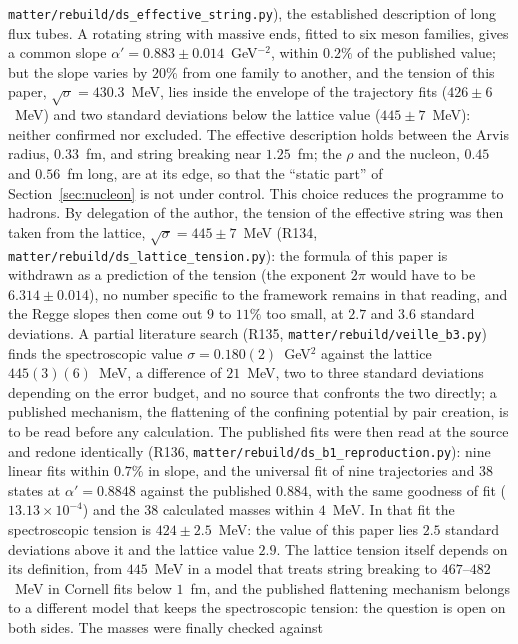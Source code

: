 \documentclass[11pt,a4paper]{article}
\theoremstyle{plain}
\theoremstyle{remark}
\begin{document}
\texttt{matter/rebuild/ds\_effective\_string.py}), the established description of long flux tubes. A rotating string
with massive ends, fitted to six meson families, gives a common slope $\alpha'=0.883\pm0.014$~GeV$^{-2}$, within
$0.2\%$ of the published value; but the slope varies by $20\%$ from one family to another, and the tension of this
paper, $\sqrt{\sigma}=430.3$~MeV, lies inside the envelope of the trajectory fits ($426\pm6$~MeV) and two standard
deviations below the lattice value ($445\pm7$~MeV): neither confirmed nor excluded. The effective description holds
between the Arvis radius, $0.33$~fm, and string breaking near $1.25$~fm; the $\rho$ and the nucleon, $0.45$ and
$0.56$~fm long, are at its edge, so that the ``static part'' of Section~\ref{sec:nucleon} is not under control. This
choice reduces the programme to hadrons. By delegation of the author, the tension of the effective string was then
taken from the lattice, $\sqrt{\sigma}=445\pm7$~MeV (R134, \texttt{matter/rebuild/ds\_lattice\_tension.py}): the
formula of this paper is withdrawn as a prediction of the tension (the exponent $2\pi$ would have to be
$6.314\pm0.014$), no number specific to the framework remains in that reading, and the Regge slopes then come out $9$
to $11\%$ too small, at $2.7$ and $3.6$ standard deviations. A partial literature search (R135,
\texttt{matter/rebuild/veille\_b3.py}) finds the spectroscopic value $\sigma=0.180(2)$~GeV$^2$ against the lattice
$445(3)(6)$~MeV, a difference of $21$~MeV, two to three standard deviations depending on the error budget, and no
source that confronts the two directly; a published mechanism, the flattening of the confining potential by pair
creation, is to be read before any calculation. The published fits were then read at the source and redone
identically (R136, \texttt{matter/rebuild/ds\_b1\_reproduction.py}): nine linear fits within $0.7\%$ in slope, and
the universal fit of nine trajectories and 38 states at $\alpha'=0.8848$ against the published $0.884$, with the same
goodness of fit ($13.13\times10^{-4}$) and the 38 calculated masses within $4$~MeV. In that fit the spectroscopic
tension is $424\pm2.5$~MeV: the value of this paper lies $2.5$ standard deviations above it and the lattice value
$2.9$. The lattice tension itself depends on its definition, from $445$~MeV in a model that treats string breaking to
$467$--$482$~MeV in Cornell fits below $1$~fm, and the published flattening mechanism belongs to a different model
that keeps the spectroscopic tension: the question is open on both sides. The masses were finally checked against
\end{document}
